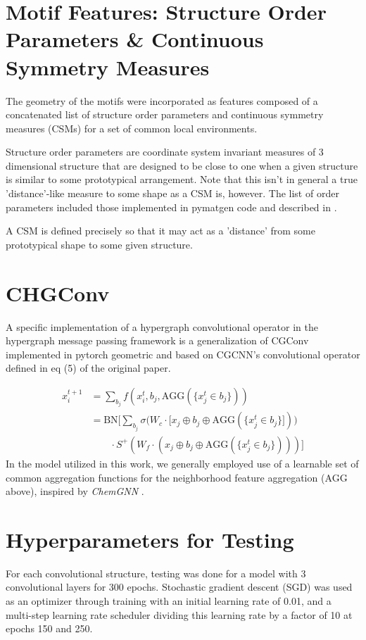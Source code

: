 \documentclass[10pt,a4paper]{article}
\begin{document}
\section{Motif Features: Structure Order Parameters \& Continuous Symmetry Measures}
The geometry of the motifs were incorporated as features composed of a concatenated list of structure order parameters and continuous symmetry measures (CSMs) for a set of common local environments. 

Structure order parameters are coordinate system invariant measures of 3 dimensional structure that are designed to be close to one when a given structure is similar to some prototypical arrangement. Note that this isn't in general a true 'distance'-like measure to some shape as a CSM is, however. The list of order parameters included those implemented in pymatgen code \cite{lsop-pymatgen} and described in \cite{orderparam1, orderparam2}.

A CSM is defined precisely so that it may act as a 'distance' from some prototypical shape to some given structure.

\section{CHGConv}\label{chgconv}
A specific implementation of a hypergraph convolutional operator in the hypergraph message passing framework is a generalization of CGConv implemented in pytorch geometric and based on CGCNN's convolutional operator defined in eq (5) of the original paper.

\begin{align*}
x_i^{t+1} &= \sum_{b_j} f(x_i^t, b_j,\text{AGG}(\lbrace x_j^t\in b_j \rbrace )) \\ 
& = \text{BN}\bigg[\sum_{b_j}\sigma \big(W_c\cdot [x_j\oplus b_j\oplus \text{AGG}(\lbrace x_j^t\in b_j \rbrace ] )\big)\\
&\quad\quad\cdot S^+ (W_f\cdot (x_j\oplus b_j\oplus \text{AGG}(\lbrace x_j^t\in b_j \rbrace ) )  ) \bigg]
\end{align*}
In the model utilized in this work, we generally employed use of a learnable set of common aggregation functions for the neighborhood feature aggregation ($\text{AGG}$ above), inspired by \textit{ChemGNN} \cite{chemgnn}.

\section{Hyperparameters for Testing}
For each convolutional structure, testing was done for a model with 3 convolutional layers for 300 epochs. Stochastic gradient descent (SGD) was used as an optimizer through training with an initial learning rate of 0.01, and a multi-step learning rate scheduler dividing this learning rate by a factor of 10 at epochs 150 and 250. 
\end{document}
